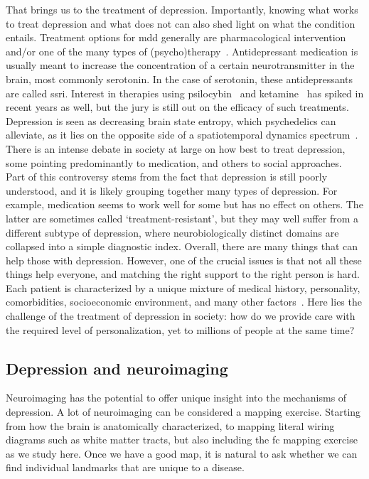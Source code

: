 That brings us to the treatment of depression.
Importantly, knowing what works to treat depression and what does not can also shed light on what the condition entails.
Treatment options for \gls{mdd} generally are pharmacological intervention and/or one of the many types of (psycho)therapy~\parencite{Otte2016}.
Antidepressant medication is usually meant to increase the concentration of a certain neurotransmitter in the brain, most commonly serotonin.
In the case of serotonin, these antidepressants are called \gls{ssri}.
Interest in therapies using psilocybin~\parencite{Carhart-Harris2016, Luppi2021, Daws2022, Singleton2022} and ketamine~\parencite{Krystal2019, Kotoula2021} has spiked in recent years as well, but the jury is still out on the efficacy of such treatments.
Depression is seen as decreasing brain state entropy, which psychedelics can alleviate, as it lies on the opposite side of a spatiotemporal dynamics spectrum~\parencite{Vohryzek2022}.
%
There is an intense debate in society at large on how best to treat depression, some pointing predominantly to medication, and others to social approaches.
Part of this controversy stems from the fact that depression is still poorly understood, and it is likely grouping together many types of depression.
For example, medication seems to work well for some but has no effect on others.
The latter are sometimes called `treatment-resistant', but they may well suffer from a different subtype of depression, where neurobiologically distinct domains are collapsed into a simple diagnostic index.
Overall, there are many things that can help those with depression.
However, one of the crucial issues is that not all these things help everyone, and matching the right support to the right person is hard.
Each patient is characterized by a unique mixture of medical history, personality, comorbidities, socioeconomic environment, and many other factors~\parencite{Trivedi2006}.
Here lies the challenge of the treatment of depression in society: how do we provide care with the required level of personalization, yet to millions of people at the same time?

\subsection{Depression and neuroimaging}\label{subsec:fc-neuroimaging}

Neuroimaging has the potential to offer unique insight into the mechanisms of depression.
A lot of neuroimaging can be considered a mapping exercise.
Starting from how the brain is anatomically characterized, to mapping literal wiring diagrams such as white matter tracts, but also including the \gls{fc} mapping exercise as we study here.
Once we have a good map, it is natural to ask whether we can find individual landmarks that are unique to a disease.

